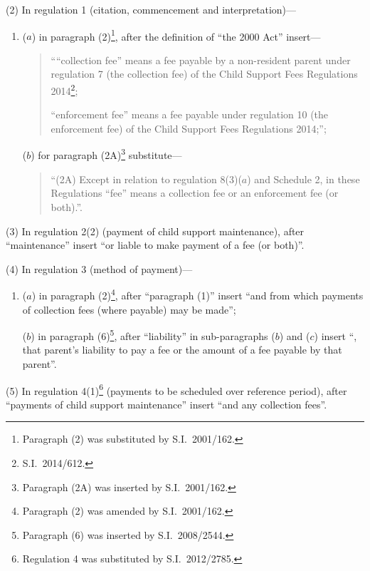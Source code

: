 \documentclass[12pt,a4paper]{article}
\begin{document}
(2) In regulation 1 (citation, commencement and interpretation)—
\begin{enumerate}\item[]
($a$) in paragraph (2)\footnote{Paragraph (2) was substituted by S.I.~2001/162.}, after the definition of “the 2000 Act” insert—
\begin{quotation}
““collection fee” means a fee payable by a non-resident parent under regulation 7 (the collection fee) of the Child Support Fees Regulations 2014\footnote{S.I.~2014/612.};

“enforcement fee” means a fee payable under regulation 10 (the enforcement fee) of the Child Support Fees Regulations 2014;”;
\end{quotation}

($b$) for paragraph (2A)\footnote{Paragraph (2A) was inserted by S.I.~2001/162.} substitute—
\begin{quotation}
“(2A) Except in relation to regulation 8(3)($a$)  and Schedule 2, in these Regulations “fee” means a collection fee or an enforcement fee (or both).”.
\end{quotation}
\end{enumerate}

(3) In regulation 2(2) (payment of child support maintenance), after “maintenance” insert “or liable to make payment of a fee (or both)”.

(4) In regulation 3 (method of payment)—
\begin{enumerate}\item[]
($a$) in paragraph (2)\footnote{Paragraph (2) was amended by S.I.~2001/162.}, after “paragraph (1)” insert “and from which payments of collection fees (where payable) may be made”;

($b$) in paragraph (6)\footnote{Paragraph (6) was inserted by S.I.~2008/2544.}, after “liability” in sub-paragraphs ($b$)  and ($c$)  insert “, that parent’s liability to pay a fee or the amount of a fee payable by that parent”.
\end{enumerate}

(5) In regulation 4(1)\footnote{Regulation 4 was substituted by S.I.~2012/2785.} (payments to be scheduled over reference period), after “payments of child support maintenance” insert “and any collection fees”.
\end{document}
